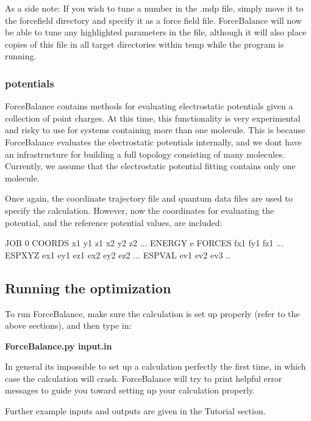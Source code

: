 As a side note\+: If you wish to tune a number in the .mdp file, simply move it to the {\ttfamily forcefield} directory and specify it as a force field file. Force\+Balance will now be able to tune any highlighted parameters in the file, although it will also place copies of this file in all target directories within {\ttfamily temp} while the program is running.\hypertarget{usage_Electrostatic}{}\subsubsection{potentials}\label{usage_Electrostatic}
Force\+Balance contains methods for evaluating electrostatic potentials given a collection of point charges. At this time, this functionality is very experimental and risky to use for systems containing more than one molecule. This is because Force\+Balance evaluates the electrostatic potentials internally, and we don\textquotesingle{}t have an infrastructure for building a full topology consisting of many molecules. Currently, we assume that the electrostatic potential fitting contains only one molecule.

Once again, the coordinate trajectory file and quantum data files are used to specify the calculation. However, now the coordinates for evaluating the potential, and the reference potential values, are included\+:

\begin{DoxyVerb} JOB 0
 COORDS x1 y1 z1 x2 y2 z2 ...
 ENERGY e
 FORCES fx1 fy1 fz1 ...
 ESPXYZ ex1 ey1 ez1 ex2 ey2 ez2 ... 
 ESPVAL ev1 ev2 ev3 ..\end{DoxyVerb}
\hypertarget{usage_running_software}{}\subsection{Running the optimization}\label{usage_running_software}
To run Force\+Balance, make sure the calculation is set up properly (refer to the above sections), and then type in\+:

{\bfseries  Force\+Balance.\+py input.\+in }

In general it\textquotesingle{}s impossible to set up a calculation perfectly the first time, in which case the calculation will crash. Force\+Balance will try to print helpful error messages to guide you toward setting up your calculation properly.

Further example inputs and outputs are given in the Tutorial section. 
